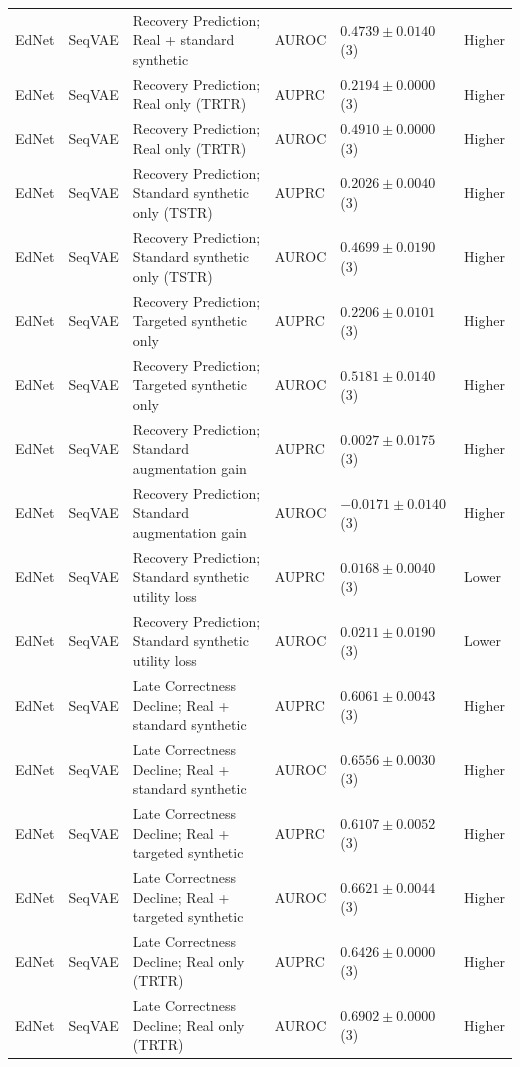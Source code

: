 \begin{longtable}{@{}p{2.25cm}p{2.05cm}p{4.7cm}p{5.0cm}p{2.6cm}p{1.25cm}@{}}
EdNet & SeqVAE & Recovery Prediction; Real + standard synthetic & AUROC & $0.4739 \mathbin{\pm} 0.0140$ (3) & Higher \\
EdNet & SeqVAE & Recovery Prediction; Real only (TRTR) & AUPRC & $0.2194 \mathbin{\pm} 0.0000$ (3) & Higher \\
EdNet & SeqVAE & Recovery Prediction; Real only (TRTR) & AUROC & $0.4910 \mathbin{\pm} 0.0000$ (3) & Higher \\
EdNet & SeqVAE & Recovery Prediction; Standard synthetic only (TSTR) & AUPRC & $0.2026 \mathbin{\pm} 0.0040$ (3) & Higher \\
EdNet & SeqVAE & Recovery Prediction; Standard synthetic only (TSTR) & AUROC & $0.4699 \mathbin{\pm} 0.0190$ (3) & Higher \\
EdNet & SeqVAE & Recovery Prediction; Targeted synthetic only & AUPRC & $0.2206 \mathbin{\pm} 0.0101$ (3) & Higher \\
EdNet & SeqVAE & Recovery Prediction; Targeted synthetic only & AUROC & $0.5181 \mathbin{\pm} 0.0140$ (3) & Higher \\
EdNet & SeqVAE & Recovery Prediction; Standard augmentation gain & AUPRC & $0.0027 \mathbin{\pm} 0.0175$ (3) & Higher \\
EdNet & SeqVAE & Recovery Prediction; Standard augmentation gain & AUROC & $-0.0171 \mathbin{\pm} 0.0140$ (3) & Higher \\
EdNet & SeqVAE & Recovery Prediction; Standard synthetic utility loss & AUPRC & $0.0168 \mathbin{\pm} 0.0040$ (3) & Lower \\
EdNet & SeqVAE & Recovery Prediction; Standard synthetic utility loss & AUROC & $0.0211 \mathbin{\pm} 0.0190$ (3) & Lower \\
EdNet & SeqVAE & Late Correctness Decline; Real + standard synthetic & AUPRC & $0.6061 \mathbin{\pm} 0.0043$ (3) & Higher \\
EdNet & SeqVAE & Late Correctness Decline; Real + standard synthetic & AUROC & $0.6556 \mathbin{\pm} 0.0030$ (3) & Higher \\
EdNet & SeqVAE & Late Correctness Decline; Real + targeted synthetic & AUPRC & $0.6107 \mathbin{\pm} 0.0052$ (3) & Higher \\
EdNet & SeqVAE & Late Correctness Decline; Real + targeted synthetic & AUROC & $0.6621 \mathbin{\pm} 0.0044$ (3) & Higher \\
EdNet & SeqVAE & Late Correctness Decline; Real only (TRTR) & AUPRC & $0.6426 \mathbin{\pm} 0.0000$ (3) & Higher \\
EdNet & SeqVAE & Late Correctness Decline; Real only (TRTR) & AUROC & $0.6902 \mathbin{\pm} 0.0000$ (3) & Higher \\

\end{longtable}
